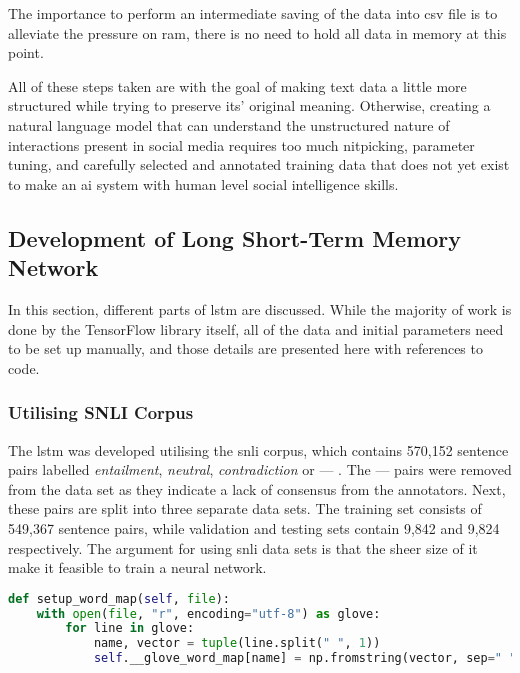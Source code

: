             The importance to perform an intermediate saving of the data into \gls{csv} file is to alleviate the pressure on \gls{ram}, there is no need to hold all data in memory at this point.
            
            All of these steps taken are with the goal of making text data a little more structured while trying to preserve its' original meaning. Otherwise, creating a natural language model that can understand the unstructured nature of interactions present in social media requires too much nitpicking, parameter tuning, and carefully selected and annotated training data that does not yet exist to make an \gls{ai} system with human level social intelligence skills.
        
    \subsection{Development of Long Short-Term Memory Network} \label{devlstm}
        In this section, different parts of \gls{lstm} are discussed. While the majority of work is done by the TensorFlow library itself, all of the data and initial parameters need to be set up manually, and those details are presented here with references to code.
    
        \subsubsection{Utilising SNLI Corpus}
            The \gls{lstm} was developed utilising the \gls{snli} corpus, which contains 570,152 sentence pairs labelled \textit{entailment}, \textit{neutral}, \textit{contradiction} or --- \autocite{Bowman2015ALA}. The --- pairs were removed from the data set as they indicate a lack of consensus from the annotators. Next, these pairs are split into three separate data sets. The training set consists of 549,367 sentence pairs, while validation and testing sets contain 9,842 and 9,824 respectively. The argument for using \gls{snli} data sets is that the sheer size of it make it feasible to train a neural network.
            
            \begin{lstlisting}[language=Python, caption=Setup of GloVe Data, label=code:glovemap]
def setup_word_map(self, file):
    with open(file, "r", encoding="utf-8") as glove:
        for line in glove:
            name, vector = tuple(line.split(" ", 1))
            self.__glove_word_map[name] = np.fromstring(vector, sep=" ")
            \end{lstlisting}
        
